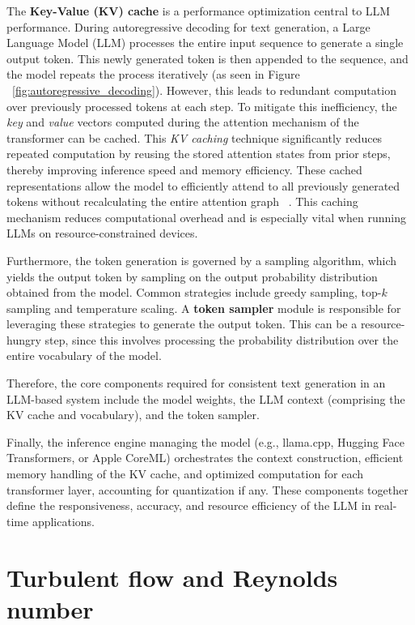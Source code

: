 The \textbf{Key-Value (KV) cache} is a performance optimization central to LLM performance. During autoregressive decoding for text generation, a Large Language Model (LLM) processes the entire input sequence to generate a single output token. This newly generated token is then appended to the sequence, and the model repeats the process iteratively (as seen in Figure ~\ref{fig:autoregressive_decoding}). However, this leads to redundant computation over previously processed tokens at each step. To mitigate this inefficiency, the \textit{key} and \textit{value} vectors computed during the attention mechanism of the transformer can be cached. This \textit{KV caching} technique significantly reduces repeated computation by reusing the stored attention states from prior steps, thereby improving inference speed and memory efficiency. These cached representations allow the model to efficiently attend to all previously generated tokens without recalculating the entire attention graph ~\cite{alammar2018illustrated}. This caching mechanism reduces computational overhead and is especially vital when running LLMs on resource-constrained devices.

Furthermore, the token generation is governed by a sampling algorithm, which yields the output token by sampling on the output probability distribution obtained from the model. Common strategies include greedy sampling, top-$k$ sampling and temperature scaling. A \textbf{token sampler} module is responsible for leveraging these strategies to generate the output token. This can be a resource-hungry step, since this involves processing the probability distribution over the entire vocabulary of the model.

Therefore, the core components required for consistent text generation in an LLM-based system include the model weights, the LLM context (comprising the KV cache and vocabulary), and the token sampler.

Finally, the inference engine managing the model (e.g., llama.cpp, Hugging Face Transformers, or Apple CoreML) orchestrates the context construction, efficient memory handling of the KV cache, and optimized computation for each transformer layer, accounting for quantization if any. These components together define the responsiveness, accuracy, and resource efficiency of the LLM in real-time applications.

\section{Turbulent flow and Reynolds number}
\label{sec:TurbulentFlowAndReynoldsNumber} 

